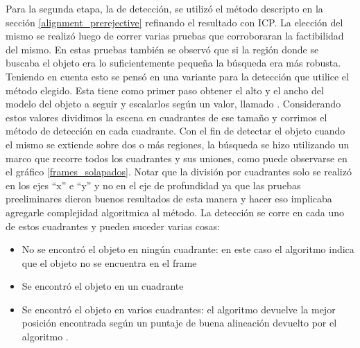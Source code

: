 Para la segunda etapa, la de detección, se utilizó el método descripto en la sección \ref{alignment_prerejective} refinando el resultado con ICP. La elección del mismo se realizó luego de correr varias pruebas que corroboraran la factibilidad del mismo. En estas pruebas también se observó que si la región donde se buscaba el objeto era lo suficientemente pequeña la búsqueda era más robusta. Teniendo en cuenta esto se pensó en una variante para la detección que utilice el método elegido. Esta tiene como primer paso obtener el alto y el ancho del modelo del objeto a seguir y escalarlos según un valor, llamado . Considerando estos valores dividimos la escena en cuadrantes de ese tamaño y corrimos el método de detección en cada cuadrante. Con el fin de detectar el objeto cuando el mismo se extiende sobre dos o más regiones, la búsqueda se hizo utilizando un marco que recorre todos los cuadrantes y sus uniones, como puede observarse en el gráfico \ref{frames_solapados}. Notar que la división por cuadrantes solo se realizó en los ejes ``x'' e ``y'' y no en el eje de profundidad ya que las pruebas preeliminares dieron buenos resultados de esta manera y hacer eso implicaba agregarle complejidad algoritmica al método. La detección se corre en cada uno de estos cuadrantes y pueden suceder varias cosas:
\begin{itemize}
	\item No se encontró el objeto en ningún cuadrante: en este caso el algoritmo indica que el objeto no se encuentra en el frame
	\item Se encontró el objeto en un cuadrante
	\item Se encontró el objeto en varios cuadrantes: el algoritmo devuelve la mejor posición encontrada según un puntaje de buena alineación devuelto por el algoritmo \ap.
\end{itemize}


